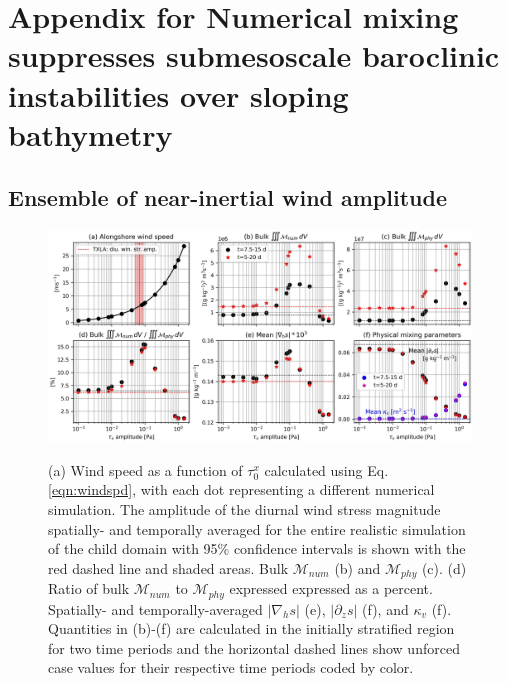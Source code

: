
\chapter{Appendix for Numerical mixing suppresses submesoscale baroclinic instabilities over sloping bathymetry}%
\section{Ensemble of near-inertial wind amplitude} 

\begin{figure}[t]
    \begin{center}
    \includegraphics[width = \linewidth]{figures/shelfstrat_2024/mixing_function_taux.jpg}\\
    \caption{(a) Wind speed as a function of $\tau_0^x$ calculated using Eq. \ref{eqn:windspd}, with each dot representing a different numerical simulation. The amplitude of the diurnal wind stress magnitude spatially- and temporally averaged for the entire realistic simulation of the child domain \citep[see Fig. 7 a of] []{Schlichting23} with 95\% confidence intervals is shown with the red dashed line and shaded areas. Bulk $\mathcal{M}_{num}$ (b) and $\mathcal{M}_{phy}$ (c). (d) Ratio of bulk $\mathcal{M}_{num}$ to $\mathcal{M}_{phy}$ expressed expressed as a percent. Spatially- and temporally-averaged $|\nabla_h s|$ (e), $|\partial_z s|$ (f), and $\kappa_v$ (f). Quantities in (b)-(f) are calculated in the initially stratified region for two time periods and the horizontal dashed lines show unforced case values for their respective time periods coded by color.} \label{fig:wind_ensembles}
     \end{center}
\end{figure}

